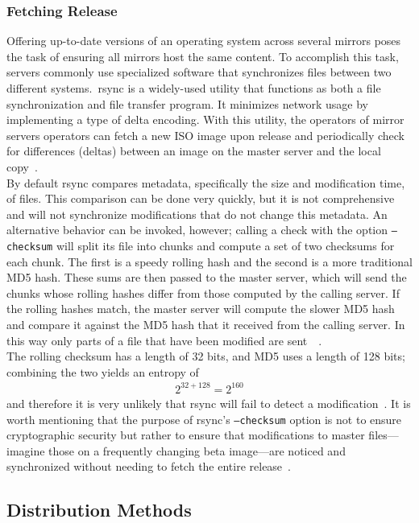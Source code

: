 \documentclass[conference]{IEEEtran}
\begin{document}
\subsubsection{Fetching Release}
Offering up-to-date versions of an operating system across several
mirrors poses the task of ensuring all mirrors host the same content.
To accomplish this task, servers commonly use specialized software that
synchronizes files between two different systems.\
rsync is a widely-used utility that functions as both a file synchronization
and file transfer program. It minimizes network usage by implementing a
type of delta encoding. With this utility, the operators of mirror
servers operators can fetch a new ISO image upon release and periodically
check for differences (deltas) between an image on the master server and
the local copy~\cite{ubuntursync}.\\
\indent By default rsync compares metadata, specifically the size and modification time, of files. This comparison can be done very quickly,
but it is not comprehensive and will not synchronize modifications that
do not change this metadata. An alternative behavior can be invoked,
however; calling a check with the option \texttt{--checksum} will split
its file into chunks and compute a set of two checksums for each chunk.
The first is a speedy rolling hash and the second is a more traditional
MD5 hash. These sums are then passed to the master server,
which will send the chunks whose rolling hashes differ from
those computed by the calling server. If the rolling hashes match,
the master server will compute the slower MD5 hash and compare it against
the MD5 hash that it received from the calling server. In this way
only parts of a file that have been modified are sent~\cite{ubuntuzsync}~\cite{sambarsync}.\\
\indent The rolling checksum has a length of 32 bits, and MD5 uses a
length of 128 bits; combining the two yields an entropy of
\begin{align*}
2^{32+128}=2^{160}
\end{align*}
and therefore it is very unlikely that rsync will fail to detect 
a modification~\cite{rsyncmath}. It is worth mentioning that the purpose of rsync's
\texttt{--checksum} option is not to ensure cryptographic security but
rather to ensure that modifications to master files---imagine those on a
frequently changing beta image---are noticed and synchronized without
needing to fetch the entire release~\cite{ubuntuzsync}.

\subsection{Distribution Methods}
\end{document}
